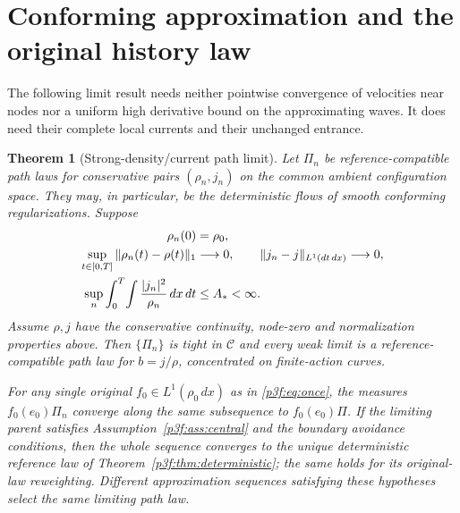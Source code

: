 \documentclass[11pt]{article}
\numberwithin{equation}{section}
\newtheorem{theorem}{Theorem}[section]
\theoremstyle{definition}
\theoremstyle{remark}
\begin{document}
\section{Conforming approximation and the original history law}
\label{p3f:sec:approximation}

The following limit result needs neither pointwise convergence of
velocities near nodes nor a uniform high derivative bound on the
approximating waves. It does need their complete local currents and
their unchanged entrance.

\begin{theorem}[Strong-density/current path limit]
\label{p3f:thm:approximation}
Let $\Pi_n$ be reference-compatible path laws for conservative pairs
$(\rho_n,j_n)$ on the common ambient configuration space. They may,
in particular, be the deterministic flows of smooth conforming
regularizations. Suppose
\begin{align}
 \rho_n(0)&=\rho_0,\notag\\
 \sup_{t\in[0,T]}\|\rho_n(t)-\rho(t)\|_1&\longrightarrow0,\qquad
 \|j_n-j\|_{L^1(dt\,dx)}\longrightarrow0,\label{p3f:eq:approxinputs}\\
 \sup_n\int_0^T\!\int\frac{|j_n|^2}{\rho_n}\,dx\,dt
 &\leq A_*<\infty.\notag
\end{align}
Assume $\rho,j$ have the conservative continuity, node-zero and
normalization properties above. Then $\{\Pi_n\}$ is tight in
$\mathcal C$ and every weak limit is a reference-compatible path law
for $b=j/\rho$, concentrated on finite-action curves.

For any single original $f_0\in L^1(\rho_0\,dx)$ as in
\eqref{p3f:eq:once}, the measures $f_0(e_0)\Pi_n$ converge along the
same subsequence to $f_0(e_0)\Pi$. If the limiting parent satisfies
Assumption~\ref{p3f:ass:central} and the boundary avoidance conditions,
then the whole sequence converges to the unique deterministic
reference law of Theorem~\ref{p3f:thm:deterministic}; the same holds
for its original-law reweighting. Different approximation sequences
satisfying these hypotheses select the same limiting path law.
\end{theorem}
\end{document}
